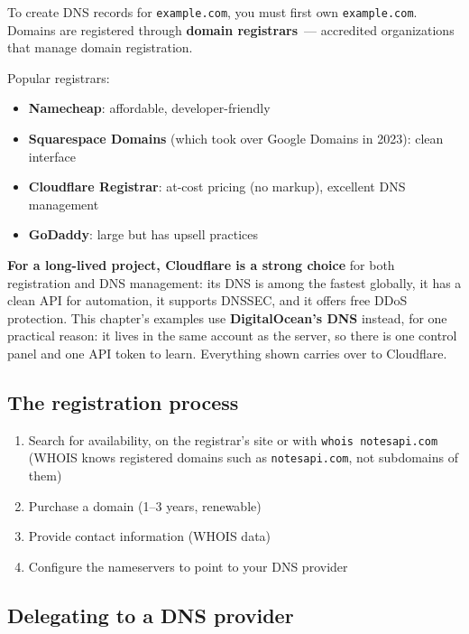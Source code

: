 To create DNS records for \texttt{example.com}, you must first own \texttt{example.com}. Domains are registered through \textbf{domain registrars}~--- accredited organizations that manage domain registration.

Popular registrars:

\begin{itemize}
\tightlist
\item
  \textbf{Namecheap}: affordable, developer-friendly
\item
  \textbf{Squarespace Domains} (which took over Google Domains in 2023): clean interface
\item
  \textbf{Cloudflare Registrar}: at-cost pricing (no markup), excellent DNS management
\item
  \textbf{GoDaddy}: large but has upsell practices
\end{itemize}

\noindent{}\textbf{For a long-lived project, Cloudflare is a strong choice} for both registration and DNS management: its DNS is among the fastest globally, it has a clean API for automation, it supports DNSSEC, and it offers free DDoS protection. This chapter's examples use \textbf{DigitalOcean's DNS} instead, for one practical reason: it lives in the same account as the server, so there is one control panel and one API token to learn. Everything shown carries over to Cloudflare.

\subsection*{The registration process}\label{27-domain-and-dns:the-registration-process}

\begin{enumerate}
\def\labelenumi{\arabic{enumi}.}
\tightlist
\item
  Search for availability, on the registrar's site or with \texttt{whois\ notesapi.com} (WHOIS knows registered domains such as \texttt{notesapi.com}, not subdomains of them)
\item
  Purchase a domain (1--3 years, renewable)
\item
  Provide contact information (WHOIS data)
\item
  Configure the nameservers to point to your DNS provider
\end{enumerate}

\subsection*{Delegating to a DNS provider}\label{27-domain-and-dns:delegating-to-a-dns-provider}

